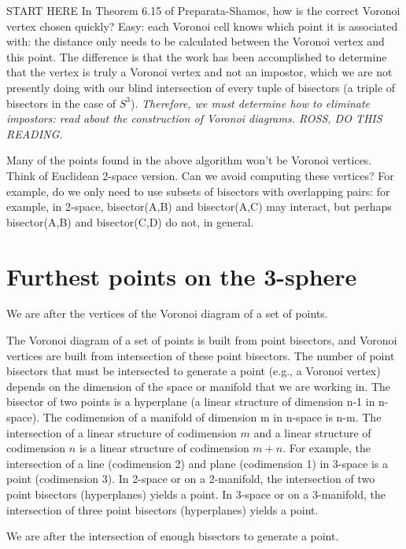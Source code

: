 \documentclass[12pt]{article}
\begin{document}
START HERE
In Theorem 6.15 of Preparata-Shamos, how is the correct Voronoi vertex chosen quickly?
Easy: each Voronoi cell knows which point it is associated with: the distance only
needs to be calculated between the Voronoi vertex and this point.
The difference is that the work has been accomplished to determine that the vertex is
truly a Voronoi vertex and not an impostor, which we are not presently doing
with our blind intersection of every tuple of bisectors (a triple of bisectors
in the case of $S^3$).
{\em Therefore, we must determine how to eliminate impostors: read about the construction
of Voronoi diagrams. ROSS, DO THIS READING.}

Many of the points found in the above algorithm won't be Voronoi vertices.
Think of Euclidean 2-space version.
Can we avoid computing these vertices?
For example, do we only need to use subsets of bisectors with overlapping pairs:
for example, in 2-space, bisector(A,B) and bisector(A,C) may interact,
but perhaps bisector(A,B) and bisector(C,D) do not, in general.


\section{Furthest points on the 3-sphere}

We are after the vertices of the Voronoi diagram of a set of points.

The Voronoi diagram of a set of points is built from point bisectors, 
and Voronoi vertices are built from intersection of these point bisectors.
The number of point bisectors that must be intersected to generate a point (e.g.,
a Voronoi vertex) 
depends on the dimension of the space or manifold that we are working in.
The bisector of two points is a hyperplane (a linear structure of dimension n-1 
in n-space).
The codimension of a manifold of dimension m in n-space is n-m.
The intersection of a linear structure of codimension $m$ and a linear structure
of codimension $n$ is a linear structure of codimension $m+n$.
For example, the intersection of a line (codimension 2) and plane (codimension 1)
in 3-space is a point (codimension 3).
In 2-space or on a 2-manifold, the intersection of two point bisectors (hyperplanes)
yields a point.
In 3-space or on a 3-manifold, the intersection of three point bisectors (hyperplanes)
yields a point.

We are after the intersection of enough bisectors to generate a point.
\end{document}
